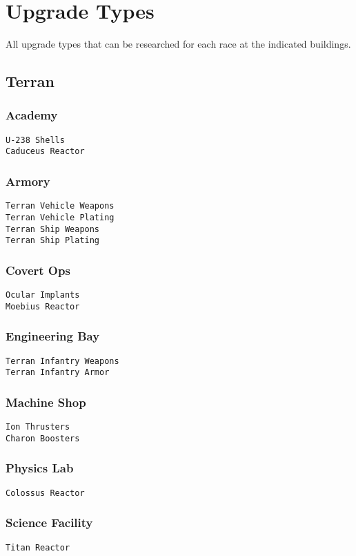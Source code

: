 \chapter{Upgrade Types}
\label{upgradetype}
All upgrade types that can be researched for each race at the indicated buildings.

\section{Terran}

\subsection{Academy}
\verb|U-238 Shells| \\
\verb|Caduceus Reactor|

\subsection{Armory}
\verb|Terran Vehicle Weapons|\\
\verb|Terran Vehicle Plating|\\
\verb|Terran Ship Weapons|\\
\verb|Terran Ship Plating|

\subsection{Covert Ops}
\verb|Ocular Implants|\\
\verb|Moebius Reactor|

\subsection{Engineering Bay}
\verb|Terran Infantry Weapons|\\
\verb|Terran Infantry Armor|

\subsection{Machine Shop}
\verb|Ion Thrusters|\\
\verb|Charon Boosters|

\subsection{Physics Lab}
\verb|Colossus Reactor|

\subsection{Science Facility}
\verb|Titan Reactor|

